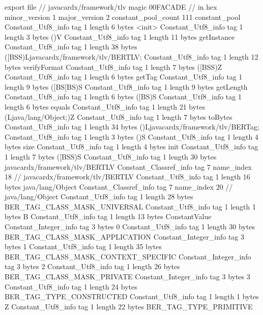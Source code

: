 export file {		// javacardx/framework/tlv
	magic	00FACADE		 // in hex
	minor_version	1
	major_version	2
	constant_pool_count	111
	constant_pool {
		Constant_Utf8_info {
			tag	1
			length	6
			bytes	<init>
		}
		Constant_Utf8_info {
			tag	1
			length	3
			bytes	()V
		}
		Constant_Utf8_info {
			tag	1
			length	11
			bytes	getInstance
		}
		Constant_Utf8_info {
			tag	1
			length	38
			bytes	([BSS)Ljavacardx/framework/tlv/BERTLV;
		}
		Constant_Utf8_info {
			tag	1
			length	12
			bytes	verifyFormat
		}
		Constant_Utf8_info {
			tag	1
			length	7
			bytes	([BSS)Z
		}
		Constant_Utf8_info {
			tag	1
			length	6
			bytes	getTag
		}
		Constant_Utf8_info {
			tag	1
			length	9
			bytes	([BS[BS)S
		}
		Constant_Utf8_info {
			tag	1
			length	9
			bytes	getLength
		}
		Constant_Utf8_info {
			tag	1
			length	6
			bytes	([BS)S
		}
		Constant_Utf8_info {
			tag	1
			length	6
			bytes	equals
		}
		Constant_Utf8_info {
			tag	1
			length	21
			bytes	(Ljava/lang/Object;)Z
		}
		Constant_Utf8_info {
			tag	1
			length	7
			bytes	toBytes
		}
		Constant_Utf8_info {
			tag	1
			length	34
			bytes	()Ljavacardx/framework/tlv/BERTag;
		}
		Constant_Utf8_info {
			tag	1
			length	3
			bytes	()S
		}
		Constant_Utf8_info {
			tag	1
			length	4
			bytes	size
		}
		Constant_Utf8_info {
			tag	1
			length	4
			bytes	init
		}
		Constant_Utf8_info {
			tag	1
			length	7
			bytes	([BSS)S
		}
		Constant_Utf8_info {
			tag	1
			length	30
			bytes	javacardx/framework/tlv/BERTLV
		}
		Constant_Classref_info {
			tag	7
			name_index	18		// javacardx/framework/tlv/BERTLV
		}
		Constant_Utf8_info {
			tag	1
			length	16
			bytes	java/lang/Object
		}
		Constant_Classref_info {
			tag	7
			name_index	20		// java/lang/Object
		}
		Constant_Utf8_info {
			tag	1
			length	28
			bytes	BER_TAG_CLASS_MASK_UNIVERSAL
		}
		Constant_Utf8_info {
			tag	1
			length	1
			bytes	B
		}
		Constant_Utf8_info {
			tag	1
			length	13
			bytes	ConstantValue
		}
		Constant_Integer_info {
			tag	3
			bytes	0
		}
		Constant_Utf8_info {
			tag	1
			length	30
			bytes	BER_TAG_CLASS_MASK_APPLICATION
		}
		Constant_Integer_info {
			tag	3
			bytes	1
		}
		Constant_Utf8_info {
			tag	1
			length	35
			bytes	BER_TAG_CLASS_MASK_CONTEXT_SPECIFIC
		}
		Constant_Integer_info {
			tag	3
			bytes	2
		}
		Constant_Utf8_info {
			tag	1
			length	26
			bytes	BER_TAG_CLASS_MASK_PRIVATE
		}
		Constant_Integer_info {
			tag	3
			bytes	3
		}
		Constant_Utf8_info {
			tag	1
			length	24
			bytes	BER_TAG_TYPE_CONSTRUCTED
		}
		Constant_Utf8_info {
			tag	1
			length	1
			bytes	Z
		}
		Constant_Utf8_info {
			tag	1
			length	22
			bytes	BER_TAG_TYPE_PRIMITIVE
}}}
